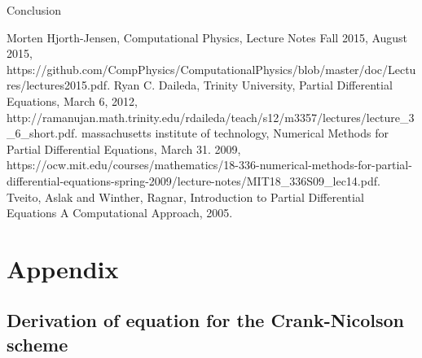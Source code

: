 \documentclass[reprint, english,notitlepage,nofootinbib]{revtex4-1}  %
\begin{document}
Conclusion


\onecolumngrid
\vspace{1cm} %

\begin{thebibliography}{}
 Morten Hjorth-Jensen, Computational Physics, Lecture Notes Fall 2015, August 2015, https://github.com/CompPhysics/ComputationalPhysics/blob/master/doc/Lectures/lectures2015.pdf.
 Ryan C. Daileda, Trinity University, Partial Differential Equations, March 6, 2012, http://ramanujan.math.trinity.edu/rdaileda/teach/s12/m3357/lectures/lecture\_3\_6\_short.pdf.
 massachusetts institute of technology, Numerical Methods for Partial Differential Equations, March 31. 2009, https://ocw.mit.edu/courses/mathematics/18-336-numerical-methods-for-partial-differential-equations-spring-2009/lecture-notes/MIT18\_336S09\_lec14.pdf.
 Tveito, Aslak and Winther, Ragnar, Introduction to Partial Differential Equations A Computational Approach, 2005.

\end{thebibliography}


\section{Appendix}

\subsection{Derivation of equation for the Crank-Nicolson scheme} \label{sect:Crank-Nicolson_derivation}
\end{document}
